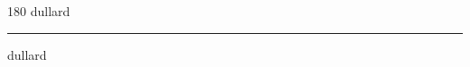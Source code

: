 
\begin{frame}
\begin{center}
\begin{turn}{180}
{\fontsize{2.5cm}{1em}\selectfont dullard}
\end{turn}
\vspace{1em}\par  
\hrule
\vspace{1em}\par  
{\fontsize{2.5cm}{1em}\selectfont dullard}
\end{center}
\end{frame}

